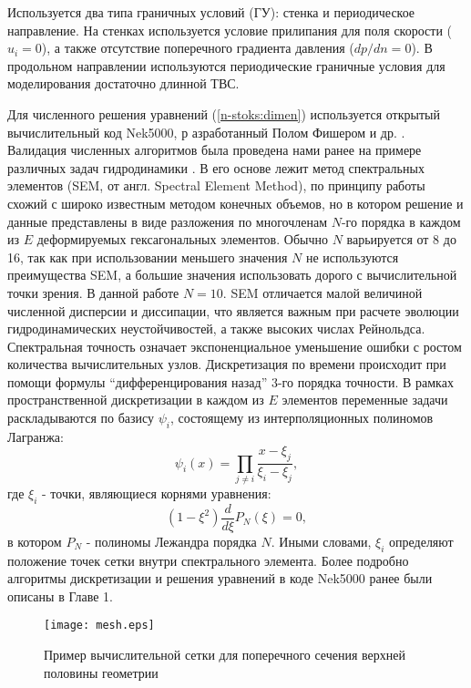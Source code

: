 %
Используется два типа граничных условий (ГУ): стенка и периодическое направление.
%
На стенках используется условие прилипания для поля скорости ($u_i = 0$), 
а также отсутствие поперечного градиента давления ($dp/dn = 0$). 
%
В продольном направлении используются периодические граничные условия для моделирования достаточно длинной ТВС.


%
Для численного решения уравнений (\ref{n-stoks:dimen}) используется открытый вычислительный код Nek5000, р
азработанный Полом Фишером и др. \cite{nek}.
%
Валидация численных алгоритмов была проведена нами ранее на примере различных задач гидродинамики 
\cite{zaripov2021mechanism,zaripov2021reverse,ivashchenko2021effect}.
%
В его основе лежит метод спектральных элементов (SEM, от англ. Spectral Element Method), 
по принципу работы схожий с широко известным методом конечных объемов, 
но в котором решение и данные представлены в виде разложения по многочленам $N$-го порядка
в каждом из $E$ деформируемых гексагональных элементов.
%
Обычно $N$ варьируется от 8 до 16, так как при использовании меньшего значения $N$ 
не используются преимущества SEM, а большие значения использовать дорого с вычислительной точки зрения. 
%
В данной работе  $N=10$.
%
SEM отличается малой величиной численной дисперсии и диссипации, 
что является важным при расчете эволюции гидродинамических неустойчивостей, а также высоких числах Рейнольдса.
%
Спектральная точность означает экспоненциальное уменьшение ошибки с ростом количества вычислительных узлов.
%
Дискретизация по времени происходит при помощи формулы ``дифференцирования назад'' 3-го порядка точности.
%
В рамках пространственной дискретизации в каждом из $E$ элементов переменные 
задачи раскладываются по базису ${\psi_i}$, состоящему из интерполяционных полиномов Лагранжа:
%
\[
\psi_i(x)=\prod_{j \neq i}\frac{x-\xi_j}{\xi_i-\xi_j}, 
\]
%
где $\xi_i$ - точки, являющиеся корнями уравнения:
\[
(1-\xi^2)\frac{d}{d\xi}P_N(\xi)=0,
\]
в котором $P_N$ - полиномы Лежандра порядка $N$. 
%
Иными словами, $\xi_i$ определяют положение точек сетки внутри спектрального элемента.
%
Более подробно алгоритмы дискретизации и решения уравнений в коде Nek5000 ранее были описаны в Главе 1.
%

%
\begin{figure}[h!]
  \centering
  \texttt{[image: mesh.eps]}
  \caption{Пример вычислительной сетки для поперечного сечения верхней половины геометрии}
  \label{fig:3}
\end{figure}



